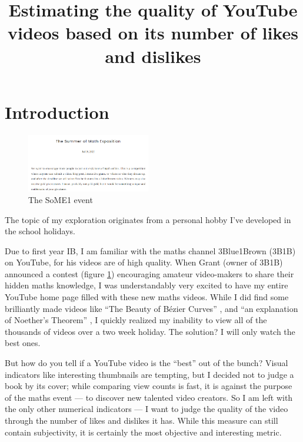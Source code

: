 \documentclass[a4paper,11pt]{article}
\title{\vspace{-8ex}Estimating the quality of YouTube videos based on its number of likes and dislikes}
\author{}
\date{\vspace{-8ex}}
\begin{document}



\maketitle

\section{Introduction}

\begin{figure}
    \centering
    \includegraphics[width=0.48\textwidth]{assets/som1.png}
    \caption{The SoME1 event}
    \label{fig:some1}
\end{figure}

The topic of my exploration originates from a personal hobby I've developed in the school holidays.

Due to first year IB, I am familiar with the maths channel 3Blue1Brown (3B1B) on YouTube, for his videos are of high quality. When Grant (owner of 3B1B) announced a contest (figure \ref{fig:some1}) \parencite{sanderson} encouraging amateur video-makers to share their hidden maths knowledge, I was understandably very excited to have my entire YouTube home page filled with these new maths videos. While I did find some brilliantly made videos like ``The Beauty of B\'{e}zier Curves'' \parencite{holmer_2021}, and ``an explanation of Noether's Theorem'' \parencite{m_2021}, I quickly realized my inability to view all of the thousands of videos over a two week holiday. The solution? I will only watch the best ones.

But how do you tell if a YouTube video is the ``best'' out of the bunch? Visual indicators like interesting thumbnails are tempting, but I decided not to judge a book by its cover; while comparing view counts is fast, it is against the purpose of the maths event --- to discover new talented video creators. So I am left with the only other numerical indicators --- I want to judge the quality of the video through the number of likes and dislikes it has. While this measure can still contain subjectivity, it is certainly the most objective and interesting metric.
\end{document}
